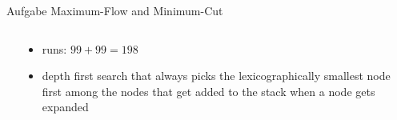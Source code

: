 \begin{frame}[allowframebreaks]{Aufgabe \thesection}{Maximum-Flow and Minimum-Cut}
\begin{solution}
\begin{columns}
    \end{columns}
  \end{solution}
  \begin{solution}
    \begin{columns}
      \begin{column}{0.5\textwidth}
      \end{column}
      \begin{column}{0.5\textwidth}
      \end{column}
    \end{columns}
  \end{solution}
  \begin{solution}
    \begin{columns}
      \begin{column}{0.5\textwidth}
      \end{column}
      \begin{column}{0.5\textwidth}
      \end{column}
    \end{columns}
  \end{solution}
  \begin{solution}
    \begin{columns}
      \begin{column}{0.5\textwidth}
      \end{column}
      \begin{column}{0.5\textwidth}
        \begin{itemize}
          \item \alert{runs:} $99 + 99 = 198$
          \item \alert{depth first search} that always picks the lexicographically smallest node first among the nodes that get added to the stack when a node gets expanded
        \end{itemize}
      \end{column}
    \end{columns}
  \end{solution}
\end{frame}
